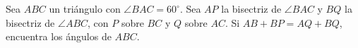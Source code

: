 Sea $ABC$ un triángulo con $\angle BAC = 60 ^\circ$. Sea $AP$ la bisectriz de $\angle BAC$ y $BQ$ la bisectriz de $\angle ABC$, con $P$ sobre $BC$ y $Q$ sobre $AC$. Si $AB+BP=AQ+BQ$, encuentra los ángulos de $ABC$.